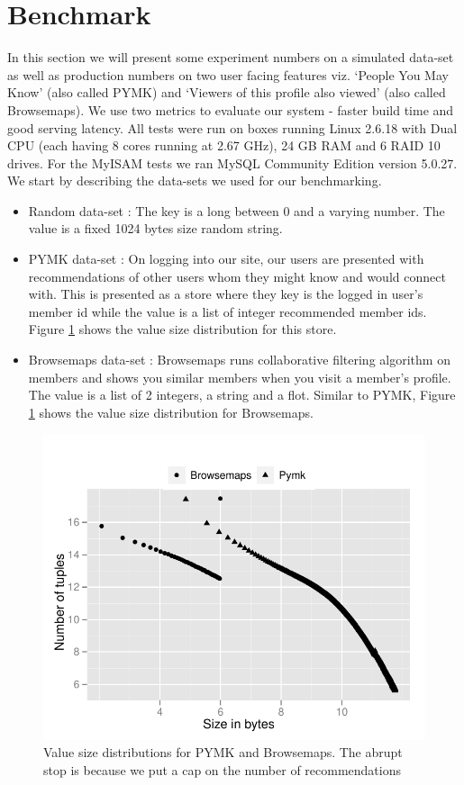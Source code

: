 \section{Benchmark}
\label{sec:benchmark}

In this section we will present some experiment numbers on a simulated data-set as well as production numbers on two user facing features viz. `People You May Know' (also called PYMK) and `Viewers of this profile also viewed' (also called Browsemaps). We use two metrics to evaluate our system - faster build time and good serving latency. All tests were run on boxes running Linux 2.6.18 with Dual CPU (each having 8 cores running at 2.67 GHz), 24 GB RAM and 6 RAID 10 drives. For the MyISAM tests we ran MySQL Community Edition version 5.0.27. We start by describing the data-sets we used for our benchmarking. 

\begin{itemize}
	\item Random data-set : The key is a long between 0 and a varying number. The value is a fixed 1024 bytes size random string. 
	\item PYMK data-set : On logging into our site, our users are presented with recommendations of other users whom they might know and would connect with. This is presented as a store where they key is the logged in user's member id while the value is a list of integer recommended member ids. Figure \ref{distribution} shows the value size distribution for this store. 
	\item Browsemaps data-set : Browsemaps runs collaborative filtering algorithm on members and shows you similar members when you visit a member's profile. The value is a list of 2 integers, a string and a flot. Similar to PYMK, Figure \ref{distribution} shows the value size distribution for Browsemaps. 
\end{itemize}

\begin{figure}
  \centering
    \includegraphics[scale=0.55]{images/data_distribution.pdf}
  \caption{Value size distributions for PYMK and Browsemaps. The abrupt stop is because we put a cap on the number of recommendations}
  \label{distribution}
\end{figure}

